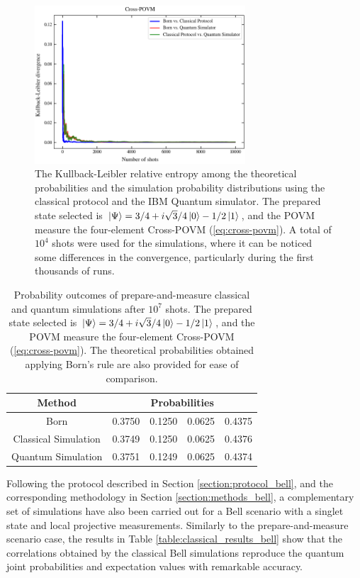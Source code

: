\begin{figure}[h!]
\centering
\includegraphics[width=0.7\textwidth]{images/pm_povm_kl_bcq.png}
\caption{The Kullback-Leibler relative entropy among the theoretical probabilities and the simulation probability distributions using the classical protocol and the IBM Quantum simulator. The prepared state selected is $\ket{\Psi}=3/4 + i \sqrt{3}/4 \ket{0} - 1/2 \ket{1}$, and the POVM measure the four-element Cross-POVM (\ref{eq:cross-povm}). A total of $10^4$ shots were used for the simulations, where it can be noticed some differences in the convergence, particularly during the first thousands of runs.}
\label{fig:classical_quantum_results_kl}
\end{figure}

\begin{table}[h!]
\centering
\begin{tabular}{c c c c c} 
 \toprule
 Method & \multicolumn{4}{c}{Probabilities}  \\ \hline
 Born & 0.3750 & 0.1250 & 0.0625 & 0.4375 \\ 
 Classical Simulation & 0.3749 & 0.1250 & 0.0625 & 0.4376 \\ 
 Quantum Simulation & 0.3751 & 0.1249 & 0.0625 & 0.4374 \\ 
 \bottomrule
\end{tabular}
\caption{Probability outcomes of prepare-and-measure classical and quantum simulations after $10^{7}$ shots. The prepared state selected is $\ket{\Psi}=3/4 + i \sqrt{3}/4 \ket{0} - 1/2 \ket{1}$, and the POVM measure the four-element Cross-POVM (\ref{eq:cross-povm}). The theoretical probabilities obtained applying Born’s rule are also
provided for ease of comparison.}
\label{table:classical_quantum_results}
\end{table}

Following the protocol described in Section \ref{section:protocol_bell}, and the corresponding methodology in Section \ref{section:methods_bell}, a complementary set of simulations have also been carried out for a Bell scenario with a singlet state and local projective measurements. Similarly to the prepare-and-measure scenario case, the results in Table \ref{table:classical_results_bell} show that the correlations obtained by the classical Bell simulations reproduce the quantum joint probabilities and expectation values with remarkable accuracy. 

